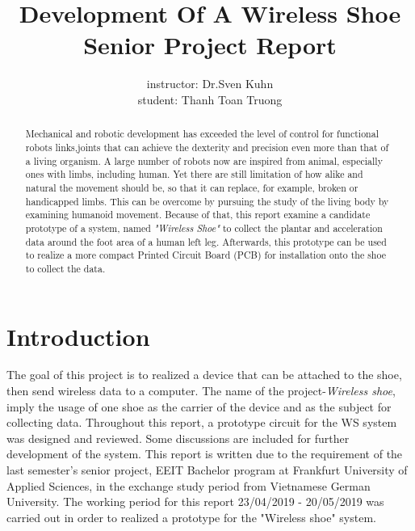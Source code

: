 \documentclass[12pt,a4paper]{article}
\author{instructor: Dr.Sven Kuhn \\ student: Thanh Toan Truong}
\title{Development Of A Wireless Shoe\\Senior Project Report}
\begin{document}
\maketitle
\pagebreak
\begin{abstract}
Mechanical and robotic development has exceeded the level of control for functional robots links,joints that can achieve the dexterity and precision even more than that of a living organism. A large number of robots now are inspired from animal, especially ones with limbs, including human. Yet there are still limitation of how alike and natural the movement should be, so that it can replace, for example, broken or handicapped limbs. This can be overcome by pursuing the study of the living body by examining humanoid movement. Because of that, this report examine a candidate prototype of a system, named \textit{"Wireless Shoe"} to collect the plantar and acceleration data around the foot area of a human left leg. Afterwards, this prototype can be used to realize a more compact Printed Circuit Board (PCB) for installation onto the shoe to collect the data.
\end{abstract}
\pagebreak
\tableofcontents
\pagebreak
\section{Introduction}
The goal of this project is to realized a device that can be attached to the shoe, then send wireless data to a computer. The name of the project-\textit{Wireless shoe}, imply the usage of one shoe as the carrier of the device and as the subject for collecting data. Throughout this report, a prototype circuit for the WS system was designed and reviewed. Some discussions are included for further development of the system. This report is written due to the requirement of the last semester's senior project, EEIT Bachelor program at Frankfurt University of Applied Sciences, in the exchange study period from Vietnamese German University.
The working period for this report 23/04/2019 - 20/05/2019 was carried out in order to realized a prototype for the "Wireless shoe" system.
\end{document}
